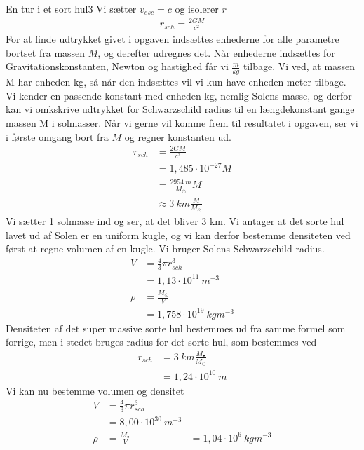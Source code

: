 \begin{opgave}{En tur i et sort hul}{3}
\opg Vi sætter $v_{esc} = c$ og isolerer $r$
\begin{align*}
r_{sch} = \frac{2GM}{c^2}
\end{align*}
For at finde udtrykket givet i opgaven indsættes enhederne for alle parametre bortset fra massen $M$, og derefter udregnes det. Når enhederne indsættes for Gravitationskonstanten, Newton og hastighed får vi $\frac{\si{m}}{\si{kg}}$ tilbage. Vi ved, at massen M har enheden kg, så når den indsættes vil vi kun have enheden meter tilbage. Vi kender en passende konstant med enheden kg, nemlig Solens masse, og derfor kan vi omkskrive udtrykket for Schwarzschild radius til en længdekonstant gange massen M i solmasser. Når vi gerne vil komme frem til resultatet i opgaven, ser vi i første omgang bort fra $M$ og regner konstanten ud. 
\begin{align*}
r_{sch} &= \frac{2GM}{c^2}\\
&=1,485\cdot 10^{-27} M\\
&= \frac{2954~\si{m}}{M_{\odot}}M\\
&\approx 3~\si{km} \frac{M}{M_{\odot}}
\end{align*}
\opg Vi sætter 1 solmasse ind og ser, at det bliver $3$ km. 
\opg Vi antager at det sorte hul lavet ud af Solen er en uniform kugle, og vi kan derfor bestemme densiteten ved først at regne volumen af en kugle. Vi bruger Solens Schwarzschild radius. 
\begin{align*}
V &= \frac{4}{3} \pi r_{sch}^3\\
&=1,13\cdot 10^{11}~\si{m}^{-3}\\
\rho &= \frac{M_{\odot}}{V} \\
&=1,758 \cdot 10^{19}~\si{kg}\si{m}^{-3}
\end{align*}
\opg Densiteten af det super massive sorte hul bestemmes ud fra samme formel som forrige, men i stedet bruges radius for det sorte hul, som bestemmes ved 
\begin{align*}
r_{sch} &= 3~\si{km} \frac{M_{\bullet}}{M_{\odot}}\\
&=1,24\cdot 10^{10}~\si{m}
\end{align*}
Vi kan nu bestemme volumen og densitet
\begin{align*}
V &= \frac{4}{3} \pi r_{sch}^3\\
&=8,00 \cdot 10^{30}~\si{m}^{-3}\\
\rho &= \frac{M_{\bullet}}{V}
&=1,04 \cdot 10^{6}~\si{kg}\si{m}^{-3}
\end{align*}

\end{opgave}
